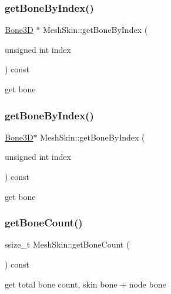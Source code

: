 \subsubsection{\texorpdfstring{get\+Bone\+By\+Index()}{getBoneByIndex()}\hspace{0.1cm}{\footnotesize\ttfamily [1/2]}}
{\footnotesize\ttfamily \hyperlink{classBone3D}{Bone3D} $\ast$ Mesh\+Skin\+::get\+Bone\+By\+Index (\begin{DoxyParamCaption}\item[{unsigned int}]{index }\end{DoxyParamCaption}) const}

get bone \mbox{\label{classMeshSkin_a6bf277ae3b68235b5a9821dd847aabf7}} 
\subsubsection{\texorpdfstring{get\+Bone\+By\+Index()}{getBoneByIndex()}\hspace{0.1cm}{\footnotesize\ttfamily [2/2]}}
{\footnotesize\ttfamily \hyperlink{classBone3D}{Bone3D}$\ast$ Mesh\+Skin\+::get\+Bone\+By\+Index (\begin{DoxyParamCaption}\item[{unsigned int}]{index }\end{DoxyParamCaption}) const}

get bone \mbox{\label{classMeshSkin_a6316d1f7adb6333b6998eb20d4420d05}} 
\subsubsection{\texorpdfstring{get\+Bone\+Count()}{getBoneCount()}\hspace{0.1cm}{\footnotesize\ttfamily [1/2]}}
{\footnotesize\ttfamily ssize\+\_\+t Mesh\+Skin\+::get\+Bone\+Count (\begin{DoxyParamCaption}{ }\end{DoxyParamCaption}) const}

get total bone count, skin bone + node bone \mbox{\label{classMeshSkin_a6316d1f7adb6333b6998eb20d4420d05}} 
